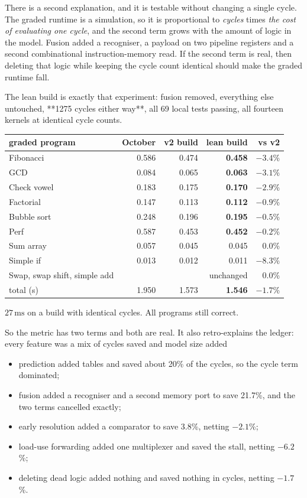 \documentclass[11pt]{article}
\begin{document}
There is a second explanation, and it is testable without changing a single cycle. The graded
runtime is a simulation, so it is proportional to \emph{cycles} times \emph{the cost of
evaluating one cycle}, and the second term grows with the amount of logic in the model. Fusion
added a recogniser, a payload on two pipeline registers and a second combinational
instruction-memory read. If the second term is real, then deleting that logic while keeping the
cycle count identical should make the graded runtime fall.

The lean build is exactly that experiment: fusion removed, everything else untouched,
**1275 cycles either way**, all 69 local tests passing, all fourteen kernels at identical cycle
counts.

\begin{center}
\small
\begin{tabular}{lrrrr}
\toprule
graded program & October & v2 build & lean build & vs v2 \\
\midrule
Fibonacci   & 0.586 & 0.474 & \textbf{0.458} & $-3.4$\% \\
GCD         & 0.084 & 0.065 & \textbf{0.063} & $-3.1$\% \\
Check vowel & 0.183 & 0.175 & \textbf{0.170} & $-2.9$\% \\
Factorial   & 0.147 & 0.113 & \textbf{0.112} & $-0.9$\% \\
Bubble sort & 0.248 & 0.196 & \textbf{0.195} & $-0.5$\% \\
Perf        & 0.587 & 0.453 & \textbf{0.452} & $-0.2$\% \\
Sum array   & 0.057 & 0.045 & 0.045 & $0.0$\% \\
Simple if   & 0.013 & 0.012 & 0.011 & $-8.3$\% \\
Swap, swap shift, simple add & & & unchanged & $0.0$\% \\
\midrule
total (s)   & 1.950 & 1.573 & \textbf{1.546} & $-1.7$\% \\
\bottomrule
\end{tabular}
\end{center}

$27\,\mathrm{ms}$ on a build with identical cycles. All programs still correct.

So the metric has two terms and both are real. It also retro-explains the ledger: every feature
was a mix of cycles saved and model size added\begin{itemize}
\item prediction added tables and saved about 20\% of the cycles, so the cycle term dominated;
\item fusion added a recogniser and a second memory port to save 21.7\%, and the two terms
  cancelled exactly;
\item early resolution added a comparator to save 3.8\%, netting $-2.1$\%;
\item load-use forwarding added one multiplexer and saved the stall, netting $-6.2$\%;
\item deleting dead logic added nothing and saved nothing in cycles, netting $-1.7$\%.
\end{itemize}
\end{document}
